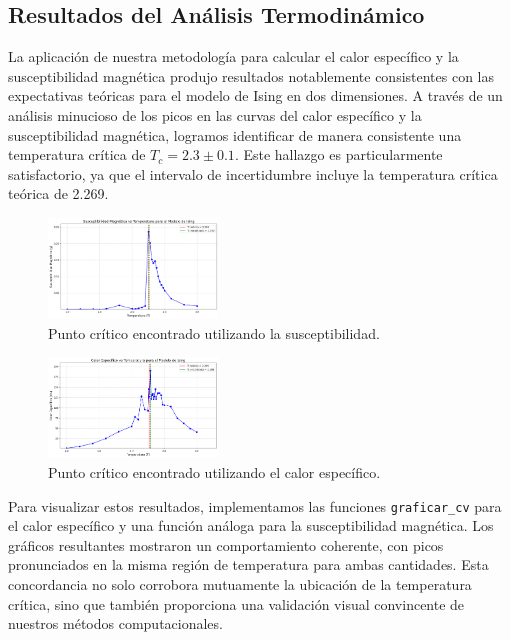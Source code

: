 \documentclass[twocolumn]{article}
\begin{document}
\subsection*{Resultados del Análisis Termodinámico}

La aplicación de nuestra metodología para calcular el calor específico y la susceptibilidad magnética produjo resultados notablemente consistentes con las expectativas teóricas para el modelo de Ising en dos dimensiones. A través de un análisis minucioso de los picos en las curvas del calor específico y la susceptibilidad magnética, logramos identificar de manera consistente una temperatura crítica de $T_c = 2.3 \pm 0.1$. Este hallazgo es particularmente satisfactorio, ya que el intervalo de incertidumbre incluye la temperatura crítica teórica de 2.269.

\begin{figure}[hbt]
    \centering
    \includegraphics[width=0.4\textwidth]{figures/puntoCritico1.png}
    \caption{Punto crítico encontrado utilizando la susceptibilidad.}
    \label{fig:puntoCritico1}
\end{figure}

\begin{figure}[hbt]
    \centering
    \includegraphics[width=0.4\textwidth]{figures/puntoCritico2.png}
    \caption{Punto crítico encontrado utilizando el calor específico.}
    \label{fig:puntoCritico2}
\end{figure}

Para visualizar estos resultados, implementamos las funciones \texttt{graficar\_cv} para el calor específico y una función análoga para la susceptibilidad magnética. Los gráficos resultantes mostraron un comportamiento coherente, con picos pronunciados en la misma región de temperatura para ambas cantidades. Esta concordancia no solo corrobora mutuamente la ubicación de la temperatura crítica, sino que también proporciona una validación visual convincente de nuestros métodos computacionales.
\end{document}
